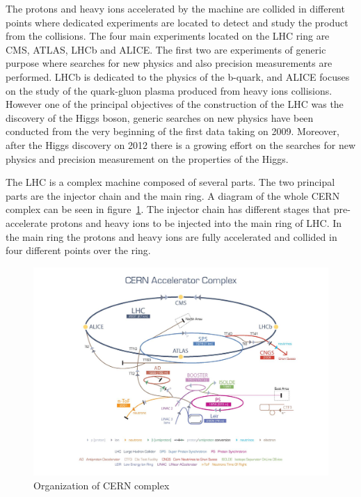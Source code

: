 The protons and heavy ions accelerated by the machine are collided in different points where dedicated experiments are located to detect and study the product from the collisions. The four main experiments located on the LHC ring are CMS, ATLAS, LHCb and ALICE. The first two are experiments of generic purpose where searches for new physics and also precision measurements are performed. LHCb is dedicated to the physics of the b-quark, and ALICE focuses on the study of the quark-gluon plasma produced from heavy ions collisions. However one of the principal objectives of the construction of the LHC was the discovery of the Higgs boson, generic searches on new physics have been conducted from the very beginning of the first data taking on 2009. Moreover, after the Higgs discovery on 2012 there is a growing effort on the searches for new physics and precision measurement on the properties of the Higgs.

The LHC is a complex machine composed of several parts. The two principal parts are the injector chain and the main ring. A diagram of the whole CERN complex can be seen in figure~\ref{fig:Complex}. The injector chain has different stages that pre-accelerate protons and heavy ions to be injected into the main ring of LHC. In the main ring the protons and heavy ions are fully accelerated and collided in four different points over the ring.

\begin{figure}[!Hhtbp]
  \begin{center}
    \includegraphics[trim=4.5cm 0cm 0cm 0cm, clip=true, width=1.15\textwidth]{figs/cern-lhc-4.jpg}
    \caption{Organization of CERN complex}
    \label{fig:Complex}
  \end{center}
\end{figure}

